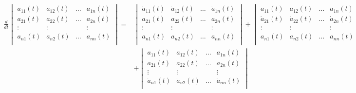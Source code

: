 \documentclass[]{article}
\begin{document}
\begin{align*}
    \frac{d}{dt} \begin{vmatrix}
        a_{11}(t) & a_{12}(t) & \dots & a_{1n}(t)\\
        a_{21}(t) & a_{22}(t) & \dots & a_{2n}(t)\\
        \vdots &\vdots & &\vdots \\
        a_{n1}(t) & a_{n2}(t) & \dots & a_{nn}(t)\\
    \end{vmatrix} 
    =&
    \begin{vmatrix}
        \dot{a}_{11}(t) & \dot{a}_{12}(t) & \dots & \dot{a}_{1n}(t)\\
        a_{21}(t) & a_{22}(t) & \dots & a_{2n}(t)\\
        \vdots &\vdots & &\vdots \\
        a_{n1}(t) & a_{n2}(t) & \dots & a_{nn}(t)\\
    \end{vmatrix}
    +
    \begin{vmatrix}
        a_{11}(t) & a_{12}(t) & \dots & a_{1n}(t)\\
        \dot{a}_{21}(t) & \dot{a}_{22}(t) & \dots & \dot{a}_{2n}(t)\\
        \vdots &\vdots & &\vdots \\
        a_{n1}(t) & a_{n2}(t) & \dots & a_{nn}(t)\\
    \end{vmatrix}  
    +
    \dots
    \\
    &+
    \begin{vmatrix}
        a_{11}(t) & a_{12}(t) & \dots & a_{1n}(t)\\
        a_{21}(t) & a_{22}(t) & \dots & a_{2n}(t)\\
        \vdots &\vdots & &\vdots \\
        \dot{a}_{n1}(t) & \dot{a}_{n2}(t) & \dots & \dot{a}_{nn}(t)\\
    \end{vmatrix}
\end{align*}
\end{document}
